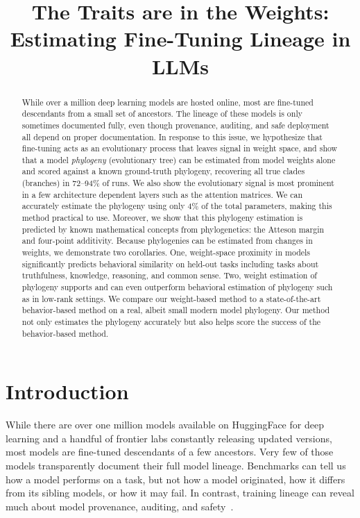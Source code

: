 \documentclass{article}
\title{The Traits are in the Weights: Estimating Fine-Tuning Lineage in LLMs}
\theoremstyle{definition}
\theoremstyle{plain}
\begin{document}
\maketitle

\begin{abstract}
While over a million deep learning models are hosted online, most are fine-tuned descendants from a small set of ancestors.  The lineage of these models is only sometimes documented fully, even though provenance, auditing, and safe deployment all depend on proper documentation. In response to this issue, we hypothesize that fine-tuning acts as an evolutionary process that leaves signal in weight space, and show that a model \textit{phylogeny} (evolutionary tree) can be estimated from model weights alone and scored against a known ground-truth phylogeny, recovering all true clades (branches) in 72--94\% of runs.  We also show the evolutionary signal is most prominent in a few architecture dependent layers such as the attention matrices.  We can accurately estimate the phylogeny using only 4\% of the total parameters, making this method practical to use. Moreover, we show that this phylogeny estimation is predicted by known mathematical concepts from phylogenetics: the Atteson margin and four-point additivity. Because phylogenies can be estimated from changes in weights, we demonstrate two corollaries.  One, weight-space proximity in models significantly predicts behavioral similarity on held-out tasks including tasks about truthfulness, knowledge, reasoning, and common sense.  Two, weight estimation of phylogeny supports and can even outperform behavioral estimation of phylogeny such as in low-rank settings.  We compare our weight-based method to a state-of-the-art behavior-based method on a real, albeit small modern model phylogeny. Our method not only estimates the phylogeny accurately but also helps score the success of the behavior-based method.

\end{abstract}

\section{Introduction}
\label{sec:intro}




While there are over one million models available on HuggingFace for deep learning and a handful of frontier
labs constantly releasing updated versions, most models are
fine-tuned descendants of a few ancestors.  Very few of those models transparently document their full model lineage. Benchmarks can tell us how a model performs on a task, but not how a model originated, how it differs from its sibling models, or how it may
fail. In contrast, training lineage can reveal much about model provenance, auditing, and safety~\cite{behavioral2026provenance, nikolic2026model, tensorguard2025}.
\end{document}
